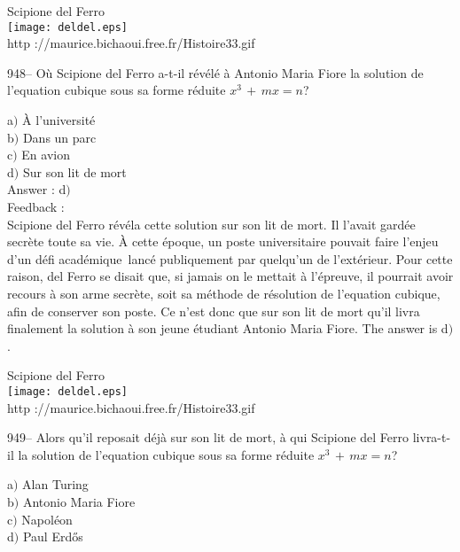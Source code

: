 \documentclass[letterpaper, 12pt]{article}
\begin{document}
        \begin{center}
        Scipione del Ferro\\
    \texttt{[image: deldel.eps]}\\
        {\footnotesize http ://maurice.bichaoui.free.fr/Histoire33.gif}
    \end{center}

948-- O\`u Scipione del Ferro a-t-il r\'ev\'el\'e \`a Antonio Maria
Fiore la solution de l'equation cubique sous sa forme r\'eduite
$x^3\,+\,mx=n$?

a$)$ \`A l'universit\'e \\
b$)$ Dans un parc \\
c$)$ En avion \\
d$)$ Sur son lit de mort\\

Answer : d$)$\\

Feedback : \\
Scipione del Ferro r\'ev\'ela cette solution sur son lit de mort. Il
l'avait gard\'ee secr\`ete toute sa vie. \`A cette \'epoque, un
poste universitaire pouvait faire l'enjeu d'un \og d\'efi
acad\'emique\fg\ lanc\'e publiquement par quelqu'un de
l'ext\'erieur. Pour cette raison, del Ferro se disait que, si jamais
on le mettait \`a l'\'epreuve, il pourrait avoir recours \`a son
arme secr\`ete, soit sa m\'ethode de r\'esolution de l'equation
cubique, afin de conserver son poste. Ce n'est donc que sur son lit
de mort qu'il livra finalement la solution \`a son jeune
\'etudiant Antonio Maria Fiore. The answer is d$)$.\\

        \begin{center}
        Scipione del Ferro\\
    \texttt{[image: deldel.eps]}\\
        {\footnotesize http ://maurice.bichaoui.free.fr/Histoire33.gif}
    \end{center}

949-- Alors qu'il reposait d\'ej\`a sur son lit de mort, \`a qui
Scipione del Ferro livra-t-il la solution de l'equation cubique
sous sa forme r\'eduite $x^3\,+\,mx=n$?

a$)$ Alan Turing \\
b$)$ Antonio Maria Fiore \\
c$)$ Napol\'eon \\
d$)$ Paul Erd\H{o}s\\
\end{document}
